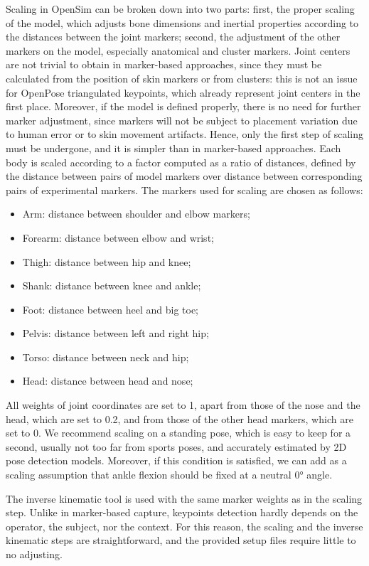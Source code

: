 Scaling in OpenSim can be broken down into two parts: first, the proper scaling of the model, which adjusts bone dimensions and inertial properties according to the distances between the joint markers; second, the adjustment of the other markers on the model, especially anatomical and cluster markers. Joint centers are not trivial to obtain in marker-based approaches, since they must be calculated from the position of skin markers or from clusters: this is not an issue for OpenPose triangulated keypoints, which already represent joint centers in the first place. Moreover, if the model is defined properly, there is no need for further marker adjustment, since markers will not be subject to placement variation due to human error or to skin movement artifacts. Hence, only the first step of scaling must be undergone, and it is simpler than in marker-based approaches. Each body is scaled according to a factor computed as a ratio of distances, defined by the distance between pairs of model markers over distance between corresponding pairs of experimental markers. The markers used for scaling are chosen as follows:

\begin{itemize}[itemsep=0em, topsep=0em, leftmargin=*]
      \item{Arm: distance between shoulder and elbow markers;}
      \item{Forearm: distance between elbow and wrist;}
      \item{Thigh: distance between hip and knee;}
      \item{Shank: distance between knee and ankle;}
      \item{Foot: distance between heel and big toe;}
      \item{Pelvis: distance between left and right hip;}
      \item{Torso: distance between neck and hip;}
      \item{Head: distance between head and nose;}
\end{itemize}
All weights of joint coordinates are set to 1, apart from those of the nose and the head, which are set to 0.2, and from those of the other head markers, which are set to 0. We recommend scaling on a standing pose, which is easy to keep for a second, usually not too far from sports poses, and accurately estimated by 2D pose detection models. Moreover, if this condition is satisfied, we can add as a scaling assumption that ankle flexion should be fixed at a neutral 0° angle. 

The inverse kinematic tool is used with the same marker weights as in the scaling step. Unlike in marker-based capture, keypoints detection hardly depends on the operator, the subject, nor the context. For this reason, the scaling and the inverse kinematic steps are straightforward, and the provided setup files require little to no adjusting.


